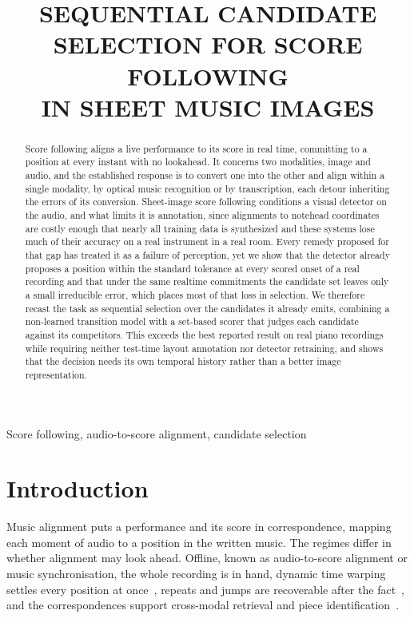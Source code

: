 \documentclass{article}
\title{SEQUENTIAL CANDIDATE SELECTION FOR SCORE FOLLOWING\\IN SHEET MUSIC IMAGES}
\begin{document}
\maketitle

\begin{abstract}
Score following aligns a live performance to its score in real time,
committing to a position at every instant with no lookahead. It concerns two
modalities, image and audio, and the established response is to convert one into the other and align within a
single modality, by optical music recognition or by transcription, each detour
inheriting the errors of its conversion. Sheet-image score following conditions a
visual detector on the audio, and what limits it is
annotation, since alignments to notehead coordinates are costly enough that
nearly all training data is synthesized and these systems lose much of their
accuracy on a real instrument in a real room. Every remedy proposed for that
gap has treated it as a failure of perception, yet we show that the detector
already proposes a position within the standard tolerance at every scored onset
of a real recording and that under the same realtime commitments the
candidate set leaves only a small irreducible error, which places most of that
loss in selection. We therefore
recast the task as sequential selection over the candidates it
already emits, combining a non-learned transition model with a set-based
scorer that judges each candidate against its competitors. This exceeds the best
reported result on real piano recordings while requiring neither test-time
layout annotation nor detector retraining, and shows that the decision needs
its own temporal history rather than a better image representation.
\end{abstract}

\begin{keywords}
Score following, audio-to-score alignment, candidate selection
\end{keywords}

\section{Introduction}
\label{sec:intro}

Music alignment puts a performance and its score in correspondence, mapping
each moment of audio to a position in the written music. The regimes differ in
whether alignment may look ahead. Offline, known as audio-to-score
alignment or music synchronisation, the whole recording is in hand, dynamic
time warping settles every position at once~\cite{dixon2005match}, repeats and
jumps are recoverable after the fact~\cite{shan2020,morsi2022}, and the
correspondences support cross-modal retrieval and piece
identification~\cite{dorfer2018msmd}.
\end{document}
